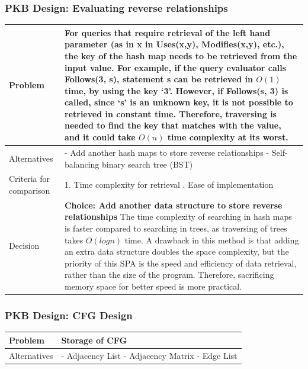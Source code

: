 \documentclass[12pt]{article}
\begin{document}
{{{{{{{{{{\subsubsection{PKB Design: Evaluating reverse relationships}
\begin{tabular}{|L{5cm} | L{12cm}| }
\hline
Problem &
For queries that require retrieval of the left hand parameter (as in x in Uses(x,y), Modifies(x,y), etc.), the key of the hash map needs to be retrieved from the input value. For example, if the query evaluator calls Follows(3, s), statement s can be retrieved in $O(1)$ time, by using the key ‘3’. However, if Follows(s, 3) is called, since ‘s’ is an unknown key, it is not possible to retrieved in constant time. Therefore, traversing is needed to find the key that matches with the value, and it could take $O(n)$ time complexity at its worst.
 \\
    \hline
    Alternatives &
- Add another hash maps to store reverse relationships
\newline - Self-balancing binary search tree (BST) 
 \\
\hline
    Criteria for comparison &
1. Time complexity for retrieval
. Ease of implementation
 \\
 \hline
   Decision & \textbf{Choice: Add another data structure to store reverse relationships}
\newline
The time complexity of searching in hash maps is faster compared to searching in trees, as traversing of trees takes $O(log n)$ time. A drawback in this method is that adding an extra data structure doubles the space complexity, but the priority of this SPA is the speed and efficiency of data retrieval, rather than the size of the program. Therefore, sacrificing memory space for better speed is more practical.
 \\
 \hline
\end{tabular}
\subsubsection{PKB Design: CFG Design}
\begin{tabular}{|L{5cm} | L{12cm}| }
\hline
Problem &
Storage of CFG
 \\
    \hline
    Alternatives &
- Adjacency List
\newline - Adjacency Matrix
\newline - Edge List


\end{tabular}}}}}}}}}}}
\end{document}
